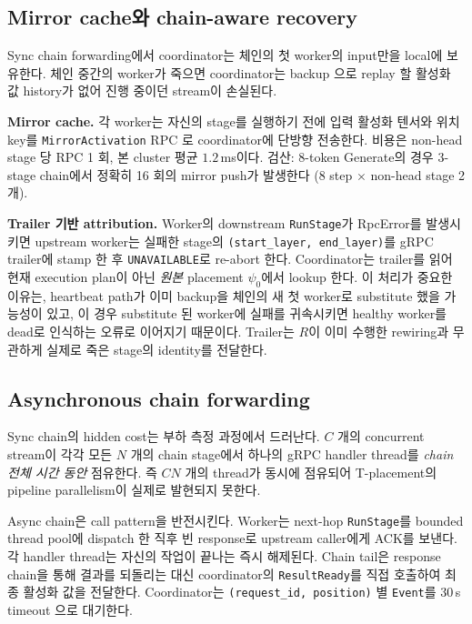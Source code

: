 \documentclass[10pt,twocolumn,a4paper]{article}
\begin{document}
\subsection{Mirror cache와 chain-aware recovery}

Sync chain forwarding에서 coordinator는 체인의 첫 worker의 input만을
local에 보유한다. 체인 중간의 worker가 죽으면 coordinator는 backup
으로 replay 할 활성화 값 history가 없어 진행 중이던 stream이
손실된다.

\textbf{Mirror cache.} 각 worker는 자신의 stage를 실행하기 전에
입력 활성화 텐서와 위치 key를 \texttt{MirrorActivation} RPC
로 coordinator에 단방향 전송한다. 비용은 non-head stage 당 RPC
1 회, 본 cluster 평균 $1.2$\,ms이다. 검산: 8-token Generate의 경우
3-stage chain에서 정확히 16 회의 mirror push가 발생한다
(8 step $\times$ non-head stage 2 개).

\textbf{Trailer 기반 attribution.} Worker의 downstream
\texttt{RunStage}가 RpcError를 발생시키면 upstream worker는 실패한
stage의 \texttt{(start\_layer, end\_layer)}를 gRPC trailer에
stamp 한 후 \texttt{UNAVAILABLE}로 re-abort 한다. Coordinator는
trailer를 읽어 현재 execution plan이 아닌 \emph{원본} placement
$\psi_0$에서 lookup 한다. 이 처리가 중요한 이유는, heartbeat path가
이미 backup을 체인의 새 첫 worker로 substitute 했을 가능성이 있고,
이 경우 substitute 된 worker에 실패를 귀속시키면 healthy worker를
dead로 인식하는 오류로 이어지기 때문이다. Trailer는 $R$이
이미 수행한 rewiring과 무관하게 실제로 죽은 stage의 identity를
전달한다.

\subsection{Asynchronous chain forwarding}

Sync chain의 hidden cost는 부하 측정 과정에서 드러난다. $C$ 개의
concurrent stream이 각각 모든 $N$ 개의 chain stage에서 하나의
gRPC handler thread를 \emph{chain 전체 시간 동안} 점유한다. 즉
$CN$ 개의 thread가 동시에 점유되어 T-placement의
pipeline parallelism이 실제로 발현되지 못한다.

Async chain은 call pattern을 반전시킨다. Worker는 next-hop
\texttt{RunStage}를 bounded thread pool에 dispatch 한 직후 빈
response로 upstream caller에게 ACK를 보낸다. 각 handler thread는
자신의 작업이 끝나는 즉시 해제된다. Chain tail은 response chain을
통해 결과를 되돌리는 대신 coordinator의 \texttt{ResultReady}를
직접 호출하여 최종 활성화 값을 전달한다. Coordinator는
\texttt{(request\_id, position)} 별 \texttt{Event}를 $30$\,s timeout
으로 대기한다.
\end{document}
